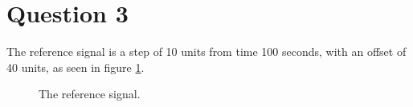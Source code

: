 \section{Question 3}

The reference signal is a step of 10 units from time 100 seconds, with an offset
of 40 units, as seen in figure \ref{fig:Q3}.

\begin{figure}[H]
	\centering
	\scalebox{1}{}
	\caption{The reference signal.}
	\label{fig:Q3}
\end{figure}
